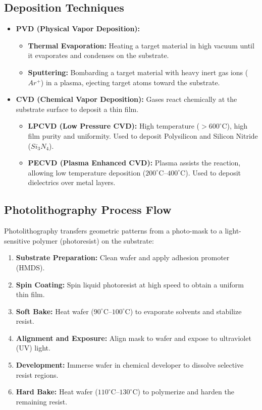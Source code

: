 \documentclass[12pt,a4paper]{article}
\begin{document}
\subsection{Deposition Techniques}
\begin{itemize}[leftmargin=*, itemsep=4pt]
  \item \textbf{PVD (Physical Vapor Deposition):}
    \begin{itemize}[leftmargin=*, itemsep=2pt]
      \item \textbf{Thermal Evaporation:} Heating a target material in high vacuum until it evaporates and condenses on the substrate.
      \item \textbf{Sputtering:} Bombarding a target material with heavy inert gas ions ($Ar^+$) in a plasma, ejecting target atoms toward the substrate.
    \end{itemize}
  \item \textbf{CVD (Chemical Vapor Deposition):} Gases react chemically at the substrate surface to deposit a thin film.
    \begin{itemize}[leftmargin=*, itemsep=2pt]
      \item \textbf{LPCVD (Low Pressure CVD):} High temperature ($> 600^{\circ}\text{C}$), high film purity and uniformity. Used to deposit Polysilicon and Silicon Nitride ($Si_3N_4$).
      \item \textbf{PECVD (Plasma Enhanced CVD):} Plasma assists the reaction, allowing low temperature deposition ($200^{\circ}\text{C}$--$400^{\circ}\text{C}$). Used to deposit dielectrics over metal layers.
    \end{itemize}
\end{itemize}

\subsection{Photolithography Process Flow}
Photolithography transfers geometric patterns from a photo-mask to a light-sensitive polymer (photoresist) on the substrate:
\begin{enumerate}[leftmargin=*, label=\arabic*., itemsep=2.5pt]
  \item \textbf{Substrate Preparation:} Clean wafer and apply adhesion promoter (HMDS).
  \item \textbf{Spin Coating:} Spin liquid photoresist at high speed to obtain a uniform thin film.
  \item \textbf{Soft Bake:} Heat wafer ($90^{\circ}\text{C}$--$100^{\circ}\text{C}$) to evaporate solvents and stabilize resist.
  \item \textbf{Alignment and Exposure:} Align mask to wafer and expose to ultraviolet (UV) light.
  \item \textbf{Development:} Immerse wafer in chemical developer to dissolve selective resist regions.
  \item \textbf{Hard Bake:} Heat wafer ($110^{\circ}\text{C}$--$130^{\circ}\text{C}$) to polymerize and harden the remaining resist.
\end{enumerate}
\end{document}
